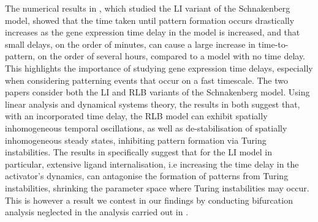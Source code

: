 The numerical results in \cite{gaffmonk}, which studied the LI variant of the Schnakenberg model, showed that the time taken until pattern formation occurs drastically increases as the gene expression time delay in the model is increased, and that small delays, on the order of minutes, can cause a large increase in time-to-pattern, on the order of several hours, compared to a model with no time delay. This highlights the importance of studying gene expression time delays, especially when considering patterning events that occur on a fast timescale. The two papers \cite{jiang, yigaffneyli} consider both the LI and RLB variants of the Schnakenberg model. Using linear analysis and dynamical systems theory, the results in both suggest that, with an incorporated time delay, the RLB model can exhibit spatially inhomogeneous temporal oscillations, as well as de-stabilisation of spatially inhomogeneous steady states, inhibiting pattern formation via Turing instabilities. The results in \cite{yigaffneyli}  specifically suggest that for the LI model in particular, extensive ligand internalisation, i.e increasing the time delay in the activator's dynamics, can antagonise the formation of patterns from Turing instabilities, shrinking the parameter space where Turing instabilities may occur. This is however a result we contest in our findings by conducting bifurcation analysis neglected in the analysis carried out in \cite{yigaffneyli}.

